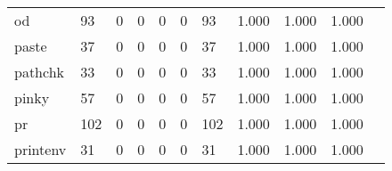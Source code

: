 \begin{longtable}{lp{1.2cm}p{1.2cm}p{1.2cm}p{1.2cm}p{1.2cm}p{1.2cm}p{1.2cm}p{1.2cm}p{1.2cm}p{1.2cm}}
od        &                                    93 &                                                  0 &                                                  0 &                                                  0 &                                                  0 &                                                 93 &                                              1.000 &                                              1.000 &                                              1.000 \\
paste     &                                    37 &                                                  0 &                                                  0 &                                                  0 &                                                  0 &                                                 37 &                                              1.000 &                                              1.000 &                                              1.000 \\
pathchk   &                                    33 &                                                  0 &                                                  0 &                                                  0 &                                                  0 &                                                 33 &                                              1.000 &                                              1.000 &                                              1.000 \\
pinky     &                                    57 &                                                  0 &                                                  0 &                                                  0 &                                                  0 &                                                 57 &                                              1.000 &                                              1.000 &                                              1.000 \\
pr        &                                   102 &                                                  0 &                                                  0 &                                                  0 &                                                  0 &                                                102 &                                              1.000 &                                              1.000 &                                              1.000 \\
printenv  &                                    31 &                                                  0 &                                                  0 &                                                  0 &                                                  0 &                                                 31 &                                              1.000 &                                              1.000 &                                              1.000 \\

\end{longtable}
